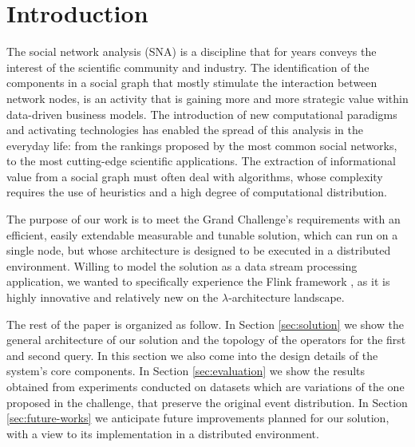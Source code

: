\section{Introduction}
\label{sec:introduction}

The social network analysis (SNA) is a discipline that for years conveys the interest of the scientific community and industry. 
The identification of the components in a social graph that mostly stimulate the interaction between network nodes, is an activity that is gaining more and more strategic value within data-driven business models. 
The introduction of new computational paradigms and activating technologies has enabled the spread of this analysis in the everyday life: from the rankings proposed by the most common social networks, to the most cutting-edge scientific applications. 
The extraction of informational value from a social graph must often deal with algorithms, whose complexity requires the use of heuristics and a high degree of computational distribution.

The purpose of our work is to meet the Grand Challenge's requirements with an efficient, easily extendable measurable and tunable solution, which can run on a single node, but whose architecture is designed to be executed in a distributed environment. Willing to model the solution as a data stream processing application, we wanted to specifically experience the Flink framework \cite{Flink}, as it is highly innovative and relatively new on the $\lambda$-architecture landscape.

The rest of the paper is organized as follow. In Section \ref{sec:solution} we show the general architecture of our solution and the topology of the operators for the first and second query. In this section we also come into the design details of the system's core components. In Section \ref{sec:evaluation} we show the results obtained from experiments conducted on datasets which are variations of the one proposed in the challenge, that preserve the original event distribution. In Section \ref{sec:future-works} we anticipate future improvements planned for our solution, with a view to its implementation in a distributed environment.